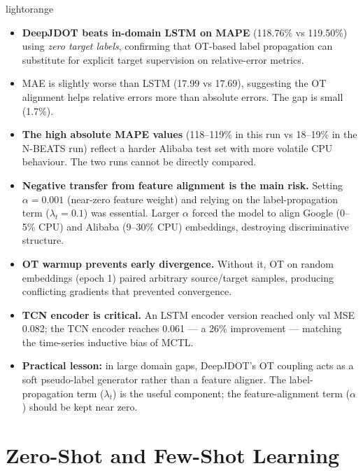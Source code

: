 \documentclass[12pt,a4paper]{article}
\begin{document}
\begin{keybox}{lightorange}
\begin{itemize}[leftmargin=*,noitemsep]
  \item \textbf{DeepJDOT beats in-domain LSTM on MAPE} (118.76\% vs 119.50\%) using
        \emph{zero target labels}, confirming that OT-based label propagation can
        substitute for explicit target supervision on relative-error metrics.
  \item MAE is slightly worse than LSTM (17.99 vs 17.69), suggesting the OT alignment
        helps relative errors more than absolute errors.  The gap is small (1.7\%).
  \item \textbf{The high absolute MAPE values} (118--119\% in this run vs 18--19\%
        in the N-BEATS run) reflect a harder Alibaba test set with more volatile CPU
        behaviour.  The two runs cannot be directly compared.
  \item \textbf{Negative transfer from feature alignment is the main risk.}
        Setting $\alpha = 0.001$ (near-zero feature weight) and relying on the
        label-propagation term ($\lambda_t = 0.1$) was essential.  Larger $\alpha$
        forced the model to align Google (0--5\% CPU) and Alibaba (9--30\% CPU)
        embeddings, destroying discriminative structure.
  \item \textbf{OT warmup prevents early divergence.}  Without it, OT on random
        embeddings (epoch 1) paired arbitrary source/target samples, producing
        conflicting gradients that prevented convergence.
  \item \textbf{TCN encoder is critical.}  An LSTM encoder version reached only
        val MSE 0.082; the TCN encoder reaches 0.061 --- a 26\% improvement ---
        matching the time-series inductive bias of MCTL.
  \item \textbf{Practical lesson:} in large domain gaps, DeepJDOT's OT coupling
        acts as a soft pseudo-label generator rather than a feature aligner.
        The label-propagation term ($\lambda_t$) is the useful component;
        the feature-alignment term ($\alpha$) should be kept near zero.
\end{itemize}
\end{keybox}

\section{Zero-Shot and Few-Shot Learning}
\label{sec:few_shot}
\end{document}
